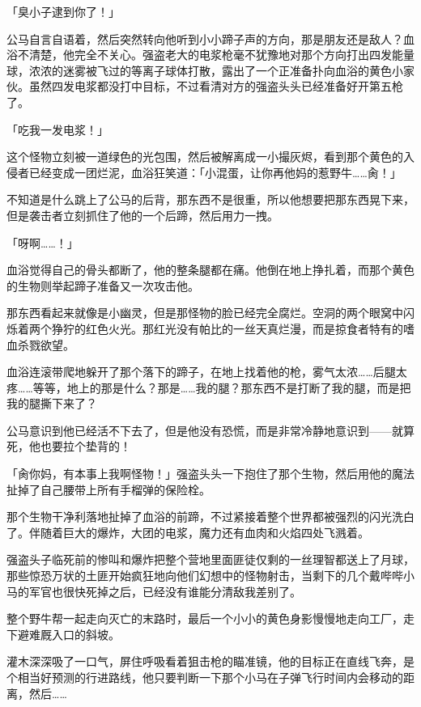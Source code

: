 「臭小子逮到你了！」

公马自言自语着，然后突然转向他听到小小蹄子声的方向，那是朋友还是敌人？血浴不清楚，他完全不关心。强盗老大的电浆枪毫不犹豫地对那个方向打出四发能量球，浓浓的迷雾被飞过的等离子球体打散，露出了一个正准备扑向血浴的黄色小家伙。虽然四发电浆都没打中目标，不过看清对方的强盗头头已经准备好开第五枪了。

「吃我一发电浆！」

这个怪物立刻被一道绿色的光包围，然后被解离成一小撮灰烬，看到那个黄色的入侵者已经变成一团烂泥，血浴狂笑道：「小混蛋，让你再他妈的惹野牛……肏！」

不知道是什么跳上了公马的后背，那东西不是很重，所以他想要把那东西晃下来，但是袭击者立刻抓住了他的一个后蹄，然后用力一拽。

「呀啊……！」

血浴觉得自己的骨头都断了，他的整条腿都在痛。他倒在地上挣扎着，而那个黄色的生物则举起蹄子准备又一次攻击他。

那东西看起来就像是小幽灵，但是那怪物的脸已经完全腐烂。空洞的两个眼窝中闪烁着两个狰狞的红色火光。那红光没有帕比的一丝天真烂漫，而是掠食者特有的嗜血杀戮欲望。

血浴连滚带爬地躲开了那个落下的蹄子，在地上找着他的枪，雾气太浓……后腿太疼……等等，地上的那是什么？那是……我的腿？那东西不是打断了我的腿，而是把我的腿撕下来了？

公马意识到他已经活不下去了，但是他没有恐慌，而是非常冷静地意识到——就算死，他也要拉个垫背的！

「肏你妈，有本事上我啊怪物！」强盗头头一下抱住了那个生物，然后用他的魔法扯掉了自己腰带上所有手榴弹的保险栓。

那个生物干净利落地扯掉了血浴的前蹄，不过紧接着整个世界都被强烈的闪光洗白了。伴随着巨大的爆炸，大团的电浆，魔力还有血肉和火焰四处飞溅着。

强盗头子临死前的惨叫和爆炸把整个营地里面匪徒仅剩的一丝理智都送上了月球，那些惊恐万状的土匪开始疯狂地向他们幻想中的怪物射击，当剩下的几个戴哔哔小马的军官也很快死掉之后，已经没有谁能分清敌我差别了。

整个野牛帮一起走向灭亡的末路时，最后一个小小的黄色身影慢慢地走向工厂，走下避难厩入口的斜坡。

\horizonline


灌木深深吸了一口气，屏住呼吸看着狙击枪的瞄准镜，他的目标正在直线飞奔，是个相当好预测的行进路线，他只要判断一下那个小马在子弹飞行时间内会移动的距离，然后……{}

